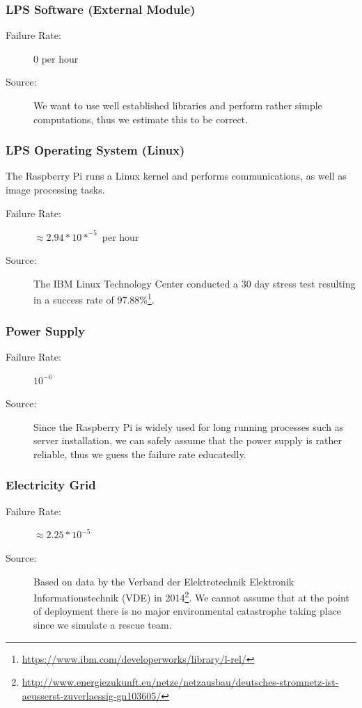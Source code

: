 \documentclass[a4paper,parskip,headheight=38pt]{scrartcl} %
\begin{document}
\subsubsection{LPS Software (External Module)}
\begin{description}
\item[Failure Rate:] $0$ per hour
\item[Source:] We want to use well established libraries and perform rather simple computations, thus we estimate this to be correct.
\end{description}

\subsubsection{LPS Operating System (Linux)}
The Raspberry Pi runs a Linux kernel and performs communications, as well as image processing tasks.
\begin{description}
\item[Failure Rate:] $\approx 2.94 * 10*^{-5}$ per hour %
\item[Source:] The IBM Linux Technology Center conducted a 30 day stress test resulting in a success rate of 97.88\%\footnote{\url{https://www.ibm.com/developerworks/library/l-rel/}}.
\end{description}

\subsubsection{Power Supply}
\begin{description}
\item[Failure Rate:] $10^{-6}$ 
\item[Source:] Since the Raspberry Pi is widely used for long running processes such as server installation, we can safely assume that the power supply is rather reliable, thus we guess the failure rate educatedly.
\end{description}

\subsubsection{Electricity Grid}
\begin{description}
\item[Failure Rate:] $\approx 2.25 * 10^{-5}$ %
\item[Source:] Based on data by the Verband der Elektrotechnik Elektronik Informationstechnik (VDE) in 2014\footnote{\url{http://www.energiezukunft.eu/netze/netzausbau/deutsches-stromnetz-ist-aeusserst-zuverlaessig-gn103605/}}. 
We cannot assume that at the point of deployment there is no major environmental catastrophe taking place since we simulate a rescue team.
\end{description}
\end{document}
